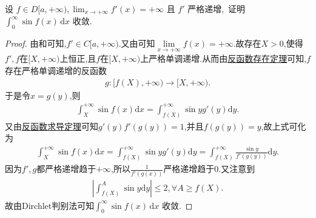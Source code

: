 \documentclass[../../main.tex]{subfiles}
\begin{document}
\begin{example}
设
\(
f \in D[a, +\infty), \lim_{x \to +\infty} f'(x) = +\infty \text{ 且 } f' \text{ 严格递增},
\)
证明 \(\int_{0}^{\infty} \sin f(x) \, \mathrm{d}x\) 收敛.
\end{example}
\begin{proof}
由和可知,$f'\in C[a,+\infty)$.又由可知$\underset{x\rightarrow +\infty}{\lim}f\left( x \right) =+\infty$.故存在$X>0$,使得$f',f$在$[X,+\infty)$上恒正,且$f$在$[X,+\infty)$上严格单调递增.从而由\hyperref[theorem:反函数存在定理]{反函数存在定理}可知,$f$存在严格单调递增的反函数
\begin{align*}
g:[f(X),+\infty)\to [X,+\infty).
\end{align*}
于是令$x=g(y)$,则
\begin{align*}
\int_X^{+\infty}{\sin f\left( x \right) \mathrm{d}x}=\int_{f\left( X \right)}^{+\infty}{\sin y}g'\left( y \right) \mathrm{d}y.
\end{align*}
又由\hyperref[theorem:反函数求导定理]{反函数求导定理}可知$g'(y)f'(g(y))=1$,并且$f(g(y))=y$,故上式可化为
\begin{align*}
\int_X^{+\infty}{\sin f\left( x \right) \mathrm{d}x}=\int_{f\left( X \right)}^{+\infty}{\sin y}g' \left( y \right) \mathrm{d}y=\int_{f\left( X \right)}^{+\infty}{\frac{\sin y}{f'\left( g\left( y \right) \right)}}\mathrm{d}y.
\end{align*}
因为$f',g$都严格递增趋于$+\infty$,所以$\frac{1}{f'(g(x))}$严格递增趋于0.又注意到
\begin{align*}
\left| \int_{f\left( X \right)}^A{\sin y}\mathrm{d}y \right|\leqslant 2,\forall A\geqslant f\left( X \right) .
\end{align*}
故由Dirchlet判别法可知\(\int_{0}^{\infty} \sin f(x) \, \mathrm{d}x\) 收敛.

\end{proof}
\end{document}
